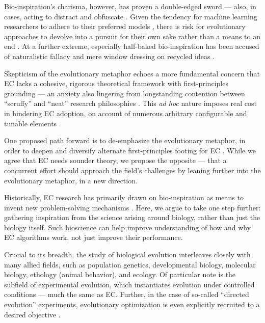 Bio-inspiration's charisma, however, has proven a double-edged sword --- also, in cases, acting to distract and obfuscate \citep{moore2023evolution,sorensen2013metaheuristics,aranha2021metaphorbased,campelo2023lessons}.
Given the tendency for machine learning researchers to adhere to their preferred models \citep{domingos2012few}, there is risk for evolutionary approaches to devolve into a pursuit for their own sake rather than a means to an end \citep{woodward2016gp,yampolskiy2018why,michalewicz2012quo}.
At a further extreme, especially half-baked bio-inspiration has been accused of naturalistic fallacy and mere window dressing on recycled ideas \citep{wortmann2020does,sorensen2013metaheuristics,simon2011analytical,campelo2023lessons,camachovillaln2022exposing,tzanetos2020nature,lones2019mitigating,delser2019bioinspired,fister2016new}.

Skepticism of the evolutionary metaphor echoes a more fundamental concern that EC lacks a cohesive, rigorous theoretical framework with first-principles grounding \citep{worzel2003genetic} --- an anxiety also lingering from longstanding contention between ``scruffy'' and ``neat'' research philosophies \citep[p.~16]{jones2008artificial, minsky1991logical}.
This \textit{ad hoc} nature imposes real cost in hindering EC adoption, on account of numerous arbitrary configurable and tunable elements \citep{oneil2010open}.

One proposed path forward is to de-emphasize the evolutionary metaphor, in order to deepen and diversify alternate first-principles footing for EC \citep{moore2023evolution}.
While we agree that EC needs sounder theory, we propose the opposite --- that a concurrent effort should approach the field's challenges by leaning further into the evolutionary metaphor, in a new direction.

Historically, EC research has primarily drawn on bio-inspiration as means to invent new problem-solving mechanisms \citep{banzhaf2006artificial,kumar2003biologically,mcphee2009developmental,gaperov2024leveraging,mouret2010importing}.
Here, we argue to take one step further: gathering inspiration from the science arising around biology, rather than just the biology itself.
Such bioscience can help improve understanding of how and why EC algorithms work, not just improve their performance.

Crucial to its breadth, the study of biological evolution interleaves closely with many allied fields, such as population genetics, developmental biology, molecular biology, ethology (animal behavior), and ecology.
Of particular note is the subfield of experimental evolution, which instantiates evolution under controlled conditions \citep{kawecki2012experimental} --- much the same as EC.
Further, in the case of so-called ``directed evolution'' experiments, evolutionary optimization is even explicitly recruited to a desired objective \citep{cobb2013directed,carroll2014applying}.

